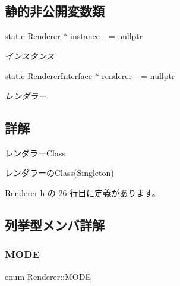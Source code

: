 \subsection*{静的非公開変数類}
\begin{DoxyCompactItemize}
\item 
static \mbox{\hyperlink{class_renderer}{Renderer}} $\ast$ \mbox{\hyperlink{class_renderer_aa0ca48ac8408e8726d5dd135432ae4fa}{instance\+\_\+}} = nullptr
\begin{DoxyCompactList}\small\item\em インスタンス \end{DoxyCompactList}\item 
static \mbox{\hyperlink{class_renderer_interface}{Renderer\+Interface}} $\ast$ \mbox{\hyperlink{class_renderer_a64d00cd885d84ff355228d884c0215dc}{renderer\+\_\+}} = nullptr
\begin{DoxyCompactList}\small\item\em レンダラー \end{DoxyCompactList}\end{DoxyCompactItemize}


\subsection{詳解}
レンダラー\+Class 

レンダラーの\+Class(\+Singleton) 

 Renderer.\+h の 26 行目に定義があります。



\subsection{列挙型メンバ詳解}
\mbox{\label{class_renderer_ab5a9379ccadcf2b3394c61cf8c835fec}} 
\subsubsection{\texorpdfstring{M\+O\+DE}{MODE}}
{\footnotesize\ttfamily enum \mbox{\hyperlink{class_renderer_ab5a9379ccadcf2b3394c61cf8c835fec}{Renderer\+::\+M\+O\+DE}}}

